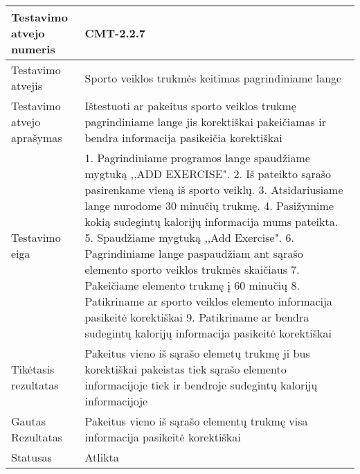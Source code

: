 \documentclass[oneside]{VUMIFPSkursinis}
\begin{document}
\begin{center}
    \begin{tabular}{ |p{5cm}|p{13cm}|}
    \hline
        Testavimo atvejo numeris & CMT-2.2.7  \\ \hline
        Testavimo atvejis & Sporto veiklos trukmės keitimas pagrindiniame lange \\ \hline
        Testavimo atvejo aprašymas & Ištestuoti ar pakeitus sporto veiklos trukmę pagrindiniame lange jis korektiškai pakeičiamas ir bendra informacija pasikeičia korektiškai \\ \hline
        Testavimo eiga &  1. Pagrindiniame programos lange spaudžiame mygtuką ,,ADD EXERCISE". 
				2. Iš pateikto sąrašo pasirenkame vieną iš sporto veiklų. 
				3. Atsidariusiame lange nurodome 30 minučių trukmę.
				4. Pasižymime kokią sudegintų kalorijų informacija mums pateikta. 
				5. Spaudžiame mygtuką ,,Add Exercise".
				6. Pagrindiniame lange paspaudžiam ant sąrašo elemento sporto veiklos trukmės skaičiaus
				7. Pakeičiame elemento trukmę į 60 minučių
				8. Patikriname ar sporto veiklos elemento informacija pasikeitė korektiškai
				9. Patikriname ar bendra sudegintų kalorijų informacija pasikeitė korektiškai\\ \hline
        Tikėtasis rezultatas &  Pakeitus vieno iš sąrašo elemetų trukmę ji bus korektiškai pakeistas tiek sąrašo elemento informacijoje tiek ir bendroje sudegintų kalorijų informacijoje \\ \hline
        Gautas Rezultatas & Pakeitus vieno iš sąrašo elementų trukmę visa informacija pasikeitė korektiškai \\ \hline
        Statusas &  Atlikta\\ \hline
    \hline
    \end{tabular}
\end{center}

\iffalse XXXXXXXXXXXXXXXXXXXXXXXXXXXXXXXXXXXXXXXXXXXXXXXXXXXXXXXXXXXXXXXXXXXXXXXXXXXXXXXXXXXXXXXXXXXXXXXXXXXXXXXXXXXXXXXXXXXXXXXXXXXXXXXXXXXXXXX \fi
\end{document}
